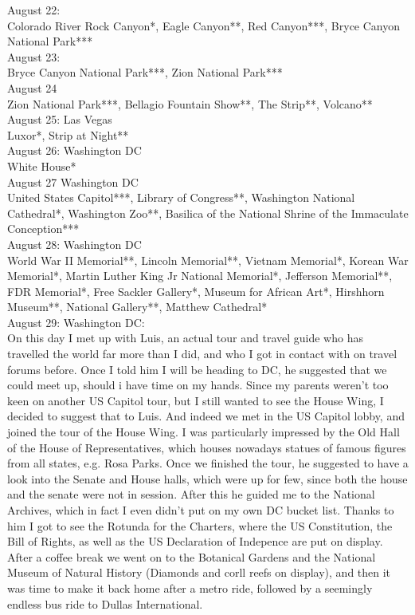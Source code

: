 August 22:\\
Colorado River Rock Canyon*, Eagle Canyon**, Red Canyon***, Bryce Canyon National Park***\\

August 23:\\
Bryce Canyon National Park***, Zion National Park***\\

August 24\\
Zion National Park***, Bellagio Fountain Show**, The Strip**, Volcano**\\

August 25: Las Vegas\\
Luxor*, Strip at Night**\\

August 26: Washington DC\\
White House*\\

August 27 Washington DC\\
United States Capitol***,  Library of Congress**, Washington National Cathedral*, Washington Zoo**, Basilica of the National Shrine of the Immaculate Conception***\\

August 28: Washington DC\\
World War II Memorial**, Lincoln Memorial**, Vietnam Memorial*, Korean War Memorial*, Martin Luther King Jr National Memorial*, Jefferson Memorial**, FDR Memorial*, Free Sackler Gallery*, Museum for African Art*, Hirshhorn Museum**, National Gallery**, Matthew Cathedral*\\

August 29: Washington DC:\\
On this day I met up with Luis, an actual tour and travel guide who has travelled the world far more than I did, and who I got in contact with on travel forums before. Once I told him I will be heading to DC, he suggested that we could meet up, should i have time on my hands. Since my parents weren't too keen on another US Capitol tour, but I still wanted to see the House Wing, I decided to suggest that to Luis. And indeed we met in the US Capitol lobby, and joined the tour of the House Wing. I was particularly impressed by the Old Hall of the House of Representatives, which houses nowadays statues of famous figures from all states, e.g. Rosa Parks. Once we finished the tour, he suggested to have a look into the Senate and House halls, which were up for few, since both the house and the senate were not in session. After this he guided me to the National Archives, which in fact I even didn't put on my own DC bucket list. Thanks to him I got to see the Rotunda for the Charters, where the US Constitution, the Bill of Rights, as well as the US Declaration of Indepence are put on display. After a coffee break we went on to the Botanical Gardens and the National Museum of Natural History (Diamonds and corll reefs on display), and then it was time to make it back home after a metro ride, followed by a seemingly endless bus ride to Dullas International.\\

